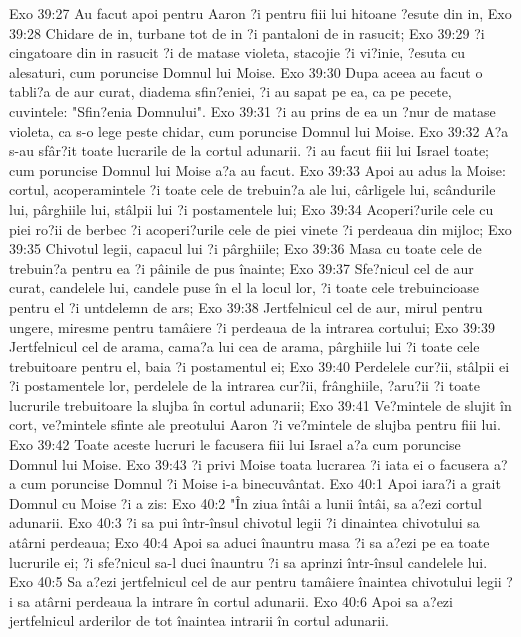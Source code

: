 Exo 39:27  Au facut apoi pentru Aaron ?i pentru fiii lui hitoane ?esute din in,
Exo 39:28  Chidare de in, turbane tot de in ?i pantaloni de in rasucit;
Exo 39:29  ?i cingatoare din in rasucit ?i de matase violeta, stacojie ?i vi?inie, ?esuta cu alesaturi, cum poruncise Domnul lui Moise.
Exo 39:30  Dupa aceea au facut o tabli?a de aur curat, diadema sfin?eniei, ?i au sapat pe ea, ca pe pecete, cuvintele: "Sfin?enia Domnului".
Exo 39:31  ?i au prins de ea un ?nur de matase violeta, ca s-o lege peste chidar, cum poruncise Domnul lui Moise.
Exo 39:32  A?a s-au sfâr?it toate lucrarile de la cortul adunarii. ?i au facut fiii lui Israel toate; cum poruncise Domnul lui Moise a?a au facut.
Exo 39:33  Apoi au adus la Moise: cortul, acoperamintele ?i toate cele de trebuin?a ale lui, cârligele lui, scândurile lui, pârghiile lui, stâlpii lui ?i postamentele lui;
Exo 39:34  Acoperi?urile cele cu piei ro?ii de berbec ?i acoperi?urile cele de piei vinete ?i perdeaua din mijloc;
Exo 39:35  Chivotul legii, capacul lui ?i pârghiile;
Exo 39:36  Masa cu toate cele de trebuin?a pentru ea ?i pâinile de pus înainte;
Exo 39:37  Sfe?nicul cel de aur curat, candelele lui, candele puse în el la locul lor, ?i toate cele trebuincioase pentru el ?i untdelemn de ars;
Exo 39:38  Jertfelnicul cel de aur, mirul pentru ungere, miresme pentru tamâiere ?i perdeaua de la intrarea cortului;
Exo 39:39  Jertfelnicul cel de arama, cama?a lui cea de arama, pârghiile lui ?i toate cele trebuitoare pentru el, baia ?i postamentul ei;
Exo 39:40  Perdelele cur?ii, stâlpii ei ?i postamentele lor, perdelele de la intrarea cur?ii, frânghiile, ?aru?ii ?i toate lucrurile trebuitoare la slujba în cortul adunarii;
Exo 39:41  Ve?mintele de slujit în cort, ve?mintele sfinte ale preotului Aaron ?i ve?mintele de slujba pentru fiii lui.
Exo 39:42  Toate aceste lucruri le facusera fiii lui Israel a?a cum poruncise Domnul lui Moise.
Exo 39:43  ?i privi Moise toata lucrarea ?i iata ei o facusera a?a cum poruncise Domnul ?i Moise i-a binecuvântat.
Exo 40:1  Apoi iara?i a grait Domnul cu Moise ?i a zis:
Exo 40:2  "În ziua întâi a lunii întâi, sa a?ezi cortul adunarii.
Exo 40:3  ?i sa pui într-însul chivotul legii ?i dinaintea chivotului sa atârni perdeaua;
Exo 40:4  Apoi sa aduci înauntru masa ?i sa a?ezi pe ea toate lucrurile ei; ?i sfe?nicul sa-l duci înauntru ?i sa aprinzi într-însul candelele lui.
Exo 40:5  Sa a?ezi jertfelnicul cel de aur pentru tamâiere înaintea chivotului legii ?i sa atârni perdeaua la intrare în cortul adunarii.
Exo 40:6  Apoi sa a?ezi jertfelnicul arderilor de tot înaintea intrarii în cortul adunarii.
